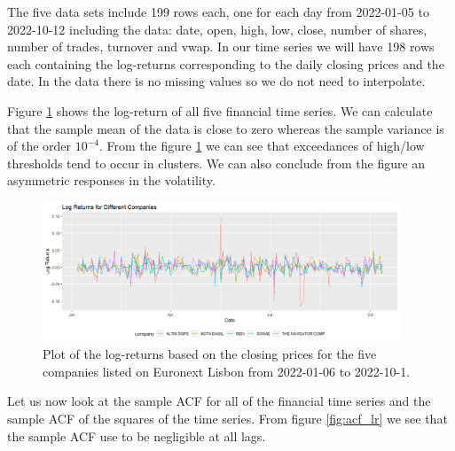 \documentclass{article}
\begin{document}
The five data sets include 199 rows each, one for each day from 2022-01-05 to 2022-10-12 including the data: date, open, high, low, close, number of shares, number of trades, turnover and vwap. In our time series we will have 198 rows each containing the log-returns corresponding to the daily closing prices and the date.
In the data there is no missing values so we do not need to interpolate. 

Figure \ref{fig:ts_lr} shows the log-return of all five financial time series. 
We can calculate that the sample mean of the data is close to zero whereas the sample variance is of the order $10^{-4}$. From the figure \ref{fig:ts_lr} we can see that exceedances of high/low thresholds tend to occur in clusters. We can also conclude from the figure an asymmetric responses in the volatility.

\begin{figure}[ht!]
    \centering
    \includegraphics[width=0.95\textwidth]{Plots2/plot1.png}
    \caption{Plot of the log-returns based on the closing prices for the five 
    companies listed on Euronext Lisbon from 2022-01-06 to 2022-10-1.}
    \label{fig:ts_lr}
\end{figure}

Let us now look at the sample ACF for all of the financial time series and the sample ACF of the squares of the time series. From figure
\ref{fig:acf_lr} we see that the sample ACF use to be negligible at all lags.  %
\end{document}
